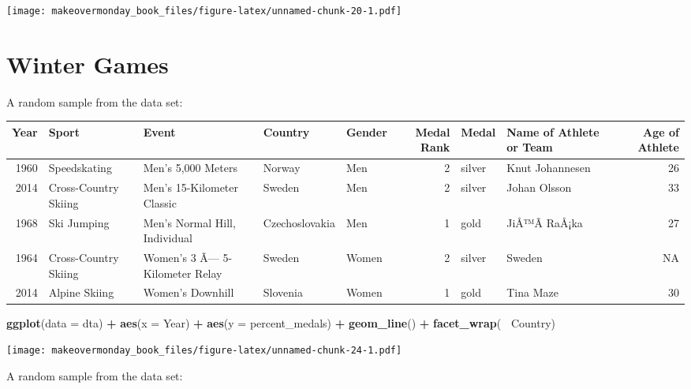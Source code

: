 \documentclass[]{book}
\newenvironment{Shaded}{\begin{snugshade}}{\end{snugshade}}
\newcommand{\KeywordTok}[1]{\textcolor[rgb]{0.13,0.29,0.53}{\textbf{#1}}}
\newcommand{\DataTypeTok}[1]{\textcolor[rgb]{0.13,0.29,0.53}{#1}}
\newcommand{\StringTok}[1]{\textcolor[rgb]{0.31,0.60,0.02}{#1}}
\newcommand{\OperatorTok}[1]{\textcolor[rgb]{0.81,0.36,0.00}{\textbf{#1}}}
\newcommand{\NormalTok}[1]{#1}
\theoremstyle{definition}
\theoremstyle{definition}
\theoremstyle{definition}
\theoremstyle{remark}
\begin{document}
\texttt{[image: makeovermonday\_book\_files/figure-latex/unnamed-chunk-20-1.pdf]}

\chapter{Winter Games}\label{winter-games}

A random sample from the data set:

\begin{tabular}{r|l|l|l|l|r|l|l|r}
\hline
Year & Sport & Event & Country & Gender & Medal Rank & Medal & Name of Athlete or Team & Age of Athlete\\
\hline
1960 & Speedskating & Men's 5,000 Meters & Norway & Men & 2 & silver & Knut Johannesen & 26\\
\hline
2014 & Cross-Country Skiing & Men's 15-Kilometer Classic & Sweden & Men & 2 & silver & Johan Olsson & 33\\
\hline
1968 & Ski Jumping & Men's Normal Hill, Individual & Czechoslovakia & Men & 1 & gold & JiÅ™Ã­ RaÅ¡ka & 27\\
\hline
1964 & Cross-Country Skiing & Women's 3 Ã— 5-Kilometer Relay & Sweden & Women & 2 & silver & Sweden & NA\\
\hline
2014 & Alpine Skiing & Women's Downhill & Slovenia & Women & 1 & gold & Tina Maze & 30\\
\hline
\end{tabular}

\begin{Shaded}
\begin{Highlighting}[]
\KeywordTok{ggplot}\NormalTok{(}\DataTypeTok{data =}\NormalTok{ dta) }\OperatorTok{+}\StringTok{ }
\StringTok{  }\KeywordTok{aes}\NormalTok{(}\DataTypeTok{x =}\NormalTok{ Year) }\OperatorTok{+}
\StringTok{  }\KeywordTok{aes}\NormalTok{(}\DataTypeTok{y =}\NormalTok{ percent_medals) }\OperatorTok{+}
\StringTok{  }\KeywordTok{geom_line}\NormalTok{() }\OperatorTok{+}\StringTok{ }
\StringTok{  }\KeywordTok{facet_wrap}\NormalTok{(}\OperatorTok{~}\StringTok{ }\NormalTok{Country)}
\end{Highlighting}
\end{Shaded}

\texttt{[image: makeovermonday\_book\_files/figure-latex/unnamed-chunk-24-1.pdf]}

A random sample from the data set:
\end{document}
